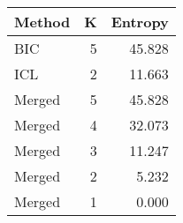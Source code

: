 \begin{center} 
\begin{tabular}{lrr}
 Method & K & Entropy \\ 
  \hline
\hline
BIC &    5 & 45.828 \\ 
  ICL &    2 & 11.663 \\ 
  Merged &    5 & 45.828 \\ 
  Merged &    4 & 32.073 \\ 
  Merged &    3 & 11.247 \\ 
  Merged &    2 & 5.232 \\ 
  Merged &    1 & 0.000 \\ 
  \end{tabular}
\end{center} 
